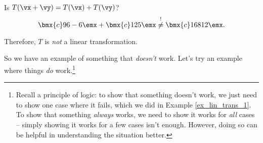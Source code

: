 {\begin{enumerate}
\ \\

	Is $T(\vx+\vy) = T(\vx)+T(\vy)$? $$\bmx{c} 9\\6\\-6\emx+\bmx{c} 1\\2\\5\emx \overset{!}{\neq} \bmx{c} 16\\8\\12\emx.$$
	\end{enumerate}
	
	Therefore, $T$ is \textit{not} a linear transformation.
}

So we have an example of something that \textit{doesn't} work. Let's try an example where things \textit{do} work.\footnote{Recall a principle of logic: to show that something doesn't work, we just need to show one case where it fails, which we did in Example \ref{ex_lin_trans_1}. To show that something \textit{always} works, we need to show it works for \textit{all} cases -- simply showing it works for a few cases isn't enough. However, doing so can be helpful in understanding the situation better.}\\

